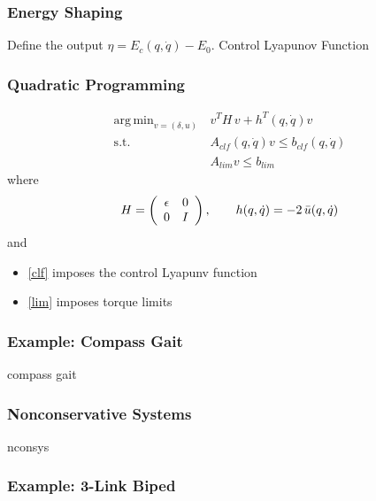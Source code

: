 \documentclass{beamer}
\DeclareMathOperator*{\argmin}{arg\,min}
\begin{document}
\begin{frame}
  \frametitle{Energy Shaping}
  Define the output $\eta = E_{c}(q, \dot q) - E_{0}$.
  Control Lyapunov Function
\end{frame}

\begin{frame}
  \frametitle{Quadratic Programming}
  \begin{align}
    \nonumber
    \argmin_{v = (\delta, u)}  \, & v^T \! H \, v + h^T(q, \dot q) v\\
    \label{clf} \tag{clf}
    \mbox{s.t. } & A_{\mathit{clf}}(q, \dot q) v \leq b_{\mathit{clf}}(q, \dot q)\\
    \label{lim} \tag{lim}
    & A_{\mathit{lim}} v \leq b_{\mathit{lim}}
  \end{align}
  where
  \begin{align*}
    H = \left(\begin{array}{c c}\epsilon & 0\\ 0 & I\end{array}\right), \qquad h(q, \dot q) = -2 \, \bar u(q, \dot q)
  \end{align*}
  and
  \begin{itemize}
  \item\eqref{clf} imposes the control Lyapunv function
  \item\eqref{lim} imposes torque limits
  \end{itemize}
\end{frame}

\begin{frame}
  \frametitle{Example: Compass Gait}
  compass gait
\end{frame}

\begin{frame}
  \frametitle{Nonconservative Systems}
  nconsys
\end{frame}

\begin{frame}
  \frametitle{Example: 3-Link Biped}
\end{frame}
\end{document}
